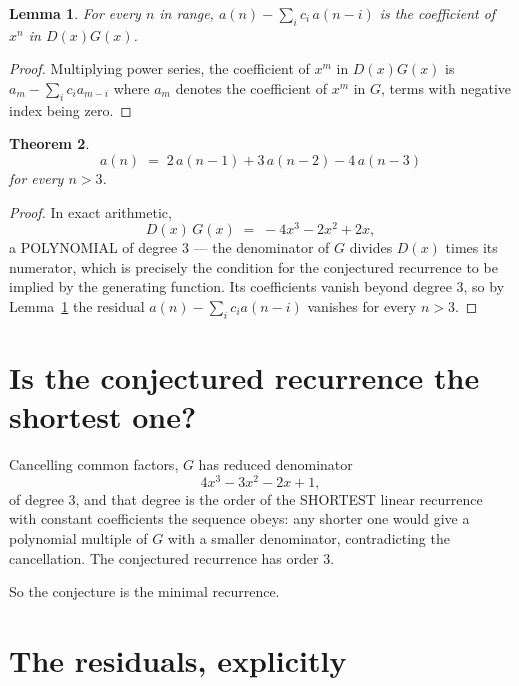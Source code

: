 \documentclass[11pt,a4paper]{article}
\theoremstyle{plain}
\newtheorem{theorem}{Theorem}
\newtheorem{lemma}[theorem]{Lemma}
\theoremstyle{definition}
\begin{document}
\begin{lemma}\label{lem:key}
For every $n$ in range, $a(n)-\sum_i c_i\,a(n-i)$ is the coefficient of $x^{n}$ in
$D(x)G(x)$.
\end{lemma}

\begin{proof}
Multiplying power series, the coefficient of $x^{m}$ in $D(x)G(x)$ is
$a_m-\sum_i c_i a_{m-i}$ where $a_m$ denotes the coefficient of $x^{m}$ in $G$, terms with
negative index being zero.
\end{proof}

\begin{theorem}
\[
a(n)\;=\;2\,a(n-1) + 3\,a(n-2) - 4\,a(n-3)
\]
for every $n>3$.
\end{theorem}

\begin{proof}
In exact arithmetic,
\[
D(x)\,G(x)\;=\;- 4 x^{3} - 2 x^{2} + 2 x,
\]
a POLYNOMIAL of degree $3$ --- the denominator of $G$ divides $D(x)$ times its numerator,
which is precisely the condition for the conjectured recurrence to be implied by the
generating function. Its coefficients vanish beyond degree $3$, so by
Lemma~\ref{lem:key} the residual $a(n)-\sum_ic_ia(n-i)$ vanishes for every
$n>3$.
\end{proof}

\section{Is the conjectured recurrence the shortest one?}

Cancelling common factors, $G$ has reduced denominator
\[
4 x^{3} - 3 x^{2} - 2 x + 1,
\]
of degree $3$, and that degree is the order of the SHORTEST linear recurrence with
constant coefficients the sequence obeys: any shorter one would give a polynomial multiple of
$G$ with a smaller denominator, contradicting the cancellation. The conjectured recurrence has
order $3$.

So the conjecture is the minimal recurrence.

\section{The residuals, explicitly}
\end{document}
